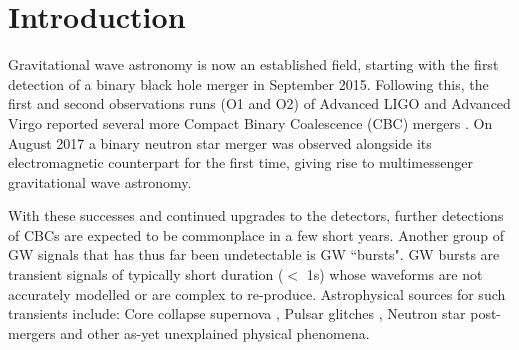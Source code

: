 \documentclass[12pt]{iopart}
\begin{document}
\section{Introduction}

%
Gravitational wave astronomy is now an established field, starting with the first
detection of a binary black hole merger \cite{Abbott2016} in September 2015.
Following this, the first and second observations runs (O1 and O2) of Advanced
LIGO and Advanced Virgo \cite{Prospects-dets, AdvLIGO, AdvLIGO2, AdvVIRGO} reported several more Compact Binary Coalescence (CBC)
mergers \cite{Abbott2016a, Abbott2017, Abbott2017a, Abbott2017b}. On August
2017 a binary neutron star merger was observed alongside its electromagnetic
counterpart for the first time, giving rise to multimessenger gravitational
wave astronomy. 

%
With these successes and continued upgrades to the detectors, further detections of CBCs are expected to be commonplace in a few short years. Another group of GW signals that has thus far been undetectable is GW ``bursts".  GW bursts are transient signals of typically short duration ($<$ 1s) whose
waveforms are not accurately modelled or are complex to re-produce.
Astrophysical sources for such transients include: Core collapse supernova \cite{Fryer_2003}, Pulsar glitches \cite{Andersson_2001}, Neutron star
post-mergers \cite{Baiotti_2007} and other as-yet unexplained physical phenomena. 
\end{document}
